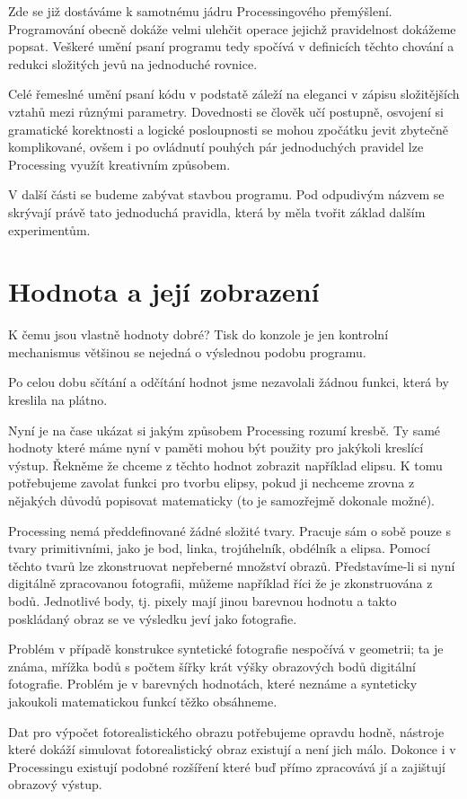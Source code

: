 \documentclass[10pt]{book}
\newcommand{\oddil}[1]{\section{#1}\index{#1}\label{#1}}
\begin{document}
Zde se již dostáváme k samotnému jádru Processingového přemýšlení. Programování obecně dokáže velmi ulehčit operace jejichž pravidelnost dokážeme popsat. Veškeré umění psaní programu tedy spočívá v definicích těchto chování a redukci složitých jevů na jednoduché rovnice.

Celé řemeslné umění psaní kódu v podstatě záleží na eleganci v zápisu složitějších vztahů mezi různými parametry. Dovednosti se člověk učí postupně, osvojení si gramatické korektnosti a logické posloupnosti se mohou zpočátku jevit zbytečně komplikované, ovšem i po ovládnutí pouhých pár jednoduchých pravidel lze Processing využít kreativním způsobem.

V další části se budeme zabývat stavbou programu. Pod odpudivým názvem se skrývají právě tato jednoduchá pravidla, která by měla tvořit základ dalším experimentům. 


\oddil{Hodnota a její zobrazení}

K čemu jsou vlastně hodnoty dobré? Tisk do konzole je jen kontrolní mechanismus většinou se nejedná o výslednou podobu programu.

Po celou dobu sčítání a odčítání hodnot jsme nezavolali žádnou funkci, která by kreslila na plátno.

Nyní je na čase ukázat si jakým způsobem Processing rozumí kresbě. Ty samé hodnoty které máme nyní v paměti mohou být použity pro jakýkoli kreslící výstup. Řekněme že chceme z těchto hodnot zobrazit například elipsu. K tomu potřebujeme zavolat funkci pro tvorbu elipsy, pokud ji nechceme zrovna z nějakých důvodů popisovat matematicky (to je samozřejmě dokonale možné).

Processing nemá předdefinované žádné složité tvary. Pracuje sám o sobě pouze s tvary primitivními, jako je bod, linka, trojúhelník, obdélník a elipsa. Pomocí těchto tvarů lze zkonstruovat nepřeberné množství obrazů. Představíme-li si nyní digitálně zpracovanou fotografii, můžeme například říci že je zkonstruována z bodů. Jednotlivé body, tj. pixely mají jinou barevnou hodnotu a takto poskládaný obraz se ve výsledku jeví jako fotografie.

Problém v případě konstrukce syntetické fotografie nespočívá v geometrii; ta je známa, mřížka bodů s počtem šířky krát výšky obrazových bodů digitální fotografie. Problém je v barevných hodnotách, které neznáme a synteticky jakoukoli matematickou funkcí těžko obsáhneme.

Dat pro výpočet fotorealistického obrazu potřebujeme opravdu hodně, nástroje které dokáží simulovat fotorealistický obraz existují a není jich málo. Dokonce i v Processingu existují podobné rozšíření které buď přímo zpracovává jí a zajištují obrazový výstup.
\end{document}

